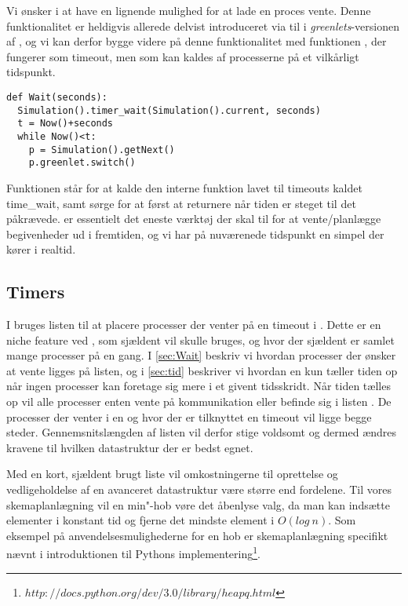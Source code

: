  Vi ønsker i \pycsp at have en lignende mulighed for at lade en proces vente. Denne funktionalitet er heldigvis allerede delvist introduceret via  til  i \emph{greenlets}-versionen af \pycsp, og vi kan derfor bygge videre på denne funktionalitet med funktionen , der fungerer som timeout, men som kan kaldes af processerne på et vilkårligt tidspunkt.
\begin{lstlisting}[firstnumber=20,float=hbtp, label=fig:wait, caption=Wait i \code{simulering}-versionen.] 
def Wait(seconds):
  Simulation().timer_wait(Simulation().current, seconds)
  t = Now()+seconds
  while Now()<t:
    p = Simulation().getNext() 
    p.greenlet.switch()
\end{lstlisting}

Funktionen  står for at kalde den interne funktion lavet til timeouts kaldet time\_wait, samt sørge for at først at returnere når tiden er steget til det påkrævede.  er essentielt det eneste værktøj der skal til for at vente/planlægge begivenheder ud i fremtiden, og vi har på nuværenede tidspunkt en simpel \des der kører i realtid. 

\subsection{Timers}  
I \pycsp bruges listen  til at placere processer der venter på en timeout i . Dette er en niche feature ved \pycsp, som  sjældent vil skulle bruges, og hvor der sjældent er samlet mange processer på en gang. 
 I \cref{sec:Wait} beskriv vi hvordan processer der ønsker at vente ligges på  listen, og i \cref{sec:tid} beskriver vi hvordan \sched en kun tæller tiden op når ingen processer kan foretage sig mere i et givent tidsskridt. Når tiden tælles op vil  alle processer enten vente på kommunikation eller befinde sig i listen . De processer der venter i en  og hvor der er tilknyttet en timeout vil ligge begge steder. Gennemsnitslængden af listen vil derfor stige voldsomt og dermed ændres kravene til hvilken  datastruktur der er bedst egnet. 
 
Med en kort, sjældent brugt liste vil omkostningerne til oprettelse og vedligeholdelse af en avanceret datastruktur være større end fordelene. Til vores skemaplanlægning  vil en min"-hob vøre det åbenlyse valg, da  man kan  indsætte elementer i konstant tid og fjerne det mindste element i $O(log\ n)$. Som eksempel på anvendelsesmulighederne for en hob er skemaplanlægning specifikt nævnt i introduktionen til Pythons implementering\footnote{$http://docs.python.org/dev/3.0/library/heapq.html$}.  

